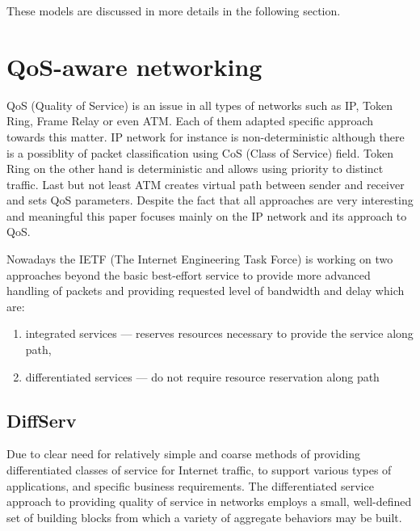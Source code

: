 \documentclass[11pt]{book}
\begin{document}
	These models are discussed in more details in the following section.
	

    \section{QoS-aware networking}

	  QoS (Quality of Service) is an issue in all types of networks such as IP, Token Ring, Frame Relay or even ATM. Each of them
	  adapted specific approach towards this matter. IP network for instance is non-deterministic although there is
	  a possiblity of packet classification using CoS (Class of Service) field. Token Ring on the other hand is deterministic
	  and allows using priority to distinct traffic. Last but not least ATM creates virtual path between sender and receiver and sets
	  QoS parameters. Despite the fact that all approaches are very interesting and meaningful this paper focuses mainly on the IP 
	  network and its approach to QoS.

	  Nowadays the IETF (The Internet Engineering Task Force) is working on two approaches
	  beyond the basic best-effort service to provide more advanced handling of packets and providing requested level 
	  of bandwidth and delay which are:

    \begin{enumerate}
      \item integrated services --- reserves resources necessary to provide the service along path,
      \item differentiated services --- do not require resource reservation along path
    \end{enumerate}
	
		\subsection{DiffServ}
		
			Due to clear need for relatively simple and coarse methods of providing differentiated classes
			of service for Internet traffic, to support various types of applications, and specific business
			requirements. The differentiated service approach to providing quality of service in networks 
			employs a small, well-defined set of building blocks from which a variety of aggregate behaviors
			may be built. \cite{qos}
			
\end{document}
